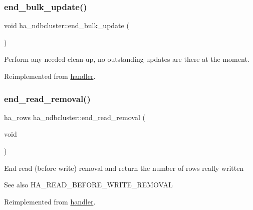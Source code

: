 \subsubsection{\texorpdfstring{end\+\_\+bulk\+\_\+update()}{end\_bulk\_update()}}
{\footnotesize\ttfamily void ha\+\_\+ndbcluster\+::end\+\_\+bulk\+\_\+update (\begin{DoxyParamCaption}{ }\end{DoxyParamCaption})\hspace{0.3cm}{\ttfamily [virtual]}}

Perform any needed clean-\/up, no outstanding updates are there at the moment. 

Reimplemented from \mbox{\hyperlink{classhandler_a2bf6c46d66ca282a4cbd6118e4c99e03}{handler}}.

\mbox{\label{classha__ndbcluster_a81e58b0a19c7cc7d857a3f00e039ae37}} 
\subsubsection{\texorpdfstring{end\+\_\+read\+\_\+removal()}{end\_read\_removal()}}
{\footnotesize\ttfamily ha\+\_\+rows ha\+\_\+ndbcluster\+::end\+\_\+read\+\_\+removal (\begin{DoxyParamCaption}\item[{void}]{ }\end{DoxyParamCaption})\hspace{0.3cm}{\ttfamily [virtual]}}

End read (before write) removal and return the number of rows really written \begin{DoxySeeAlso}{See also}
H\+A\+\_\+\+R\+E\+A\+D\+\_\+\+B\+E\+F\+O\+R\+E\+\_\+\+W\+R\+I\+T\+E\+\_\+\+R\+E\+M\+O\+V\+AL 
\end{DoxySeeAlso}


Reimplemented from \mbox{\hyperlink{classhandler_a517d99c283e85e8d97460f07a781dabf}{handler}}.

\mbox{\label{classha__ndbcluster_a59555b02c52fc703e99a41d3ee3a04c3}} 
